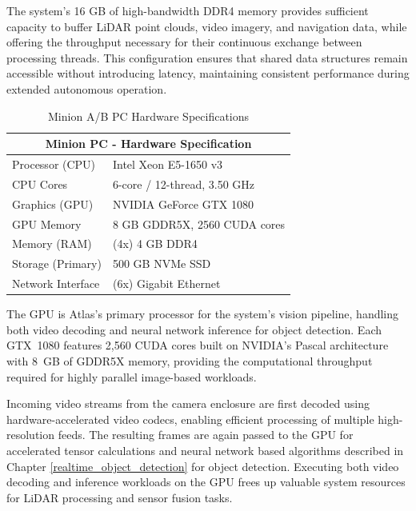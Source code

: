 \documentclass{erauthesis}
\begin{document}
The system’s 16 GB of high-bandwidth DDR4 memory provides sufficient capacity to buffer LiDAR point clouds, video imagery, and navigation data, while offering the throughput necessary for their continuous exchange between processing threads.  
This configuration ensures that shared data structures remain accessible without introducing latency, maintaining consistent performance during extended autonomous operation. 

\begin{table}[htpb]
\centering
\begin{tabular}{ll}
\hline
\multicolumn{2}{c}{Minion PC - Hardware Specification} \\
\hline
\hline
Processor (CPU) & Intel Xeon E5-1650 v3 \\
CPU Cores & 6-core / 12-thread, 3.50 GHz \\
Graphics (GPU) & NVIDIA GeForce GTX 1080 \\
GPU Memory & 8 GB GDDR5X, 2560 CUDA cores \\
Memory (RAM) & (4x) 4 GB DDR4 \\
Storage (Primary) & 500 GB NVMe SSD \\
Network Interface & (6x) Gigabit Ethernet \\%
\hline
\end{tabular}
\caption{Minion A/B PC Hardware Specifications}
\label{table:Minion_hardware}
\end{table}


The GPU is Atlas's primary processor for the system’s vision pipeline, handling both video decoding and neural network inference for object detection.
Each GTX~1080 features 2,560 CUDA cores built on NVIDIA’s Pascal architecture with 8~GB of GDDR5X memory, providing the computational throughput required for highly parallel image-based workloads.  
  
Incoming video streams from the camera enclosure are first decoded using hardware-accelerated video codecs, enabling efficient processing of multiple high-resolution feeds.
The resulting frames are again passed to the GPU for accelerated tensor calculations and neural network based algorithms described in Chapter \ref{realtime_object_detection} for object detection.
Executing both video decoding and inference workloads on the GPU frees up valuable system resources for LiDAR processing and sensor fusion tasks.
\end{document}
